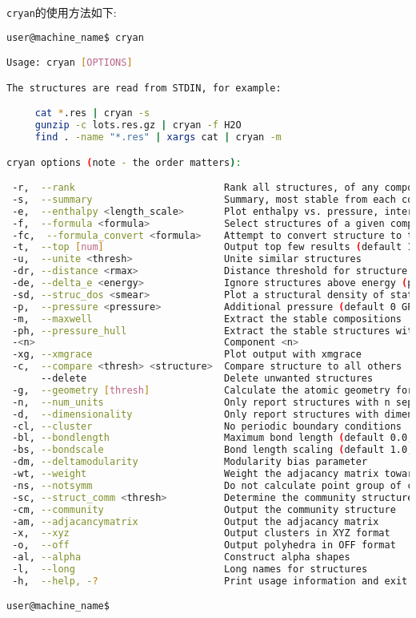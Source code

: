 \documentclass[a4paper, 10pt]{article}
\begin{document}
\verb|cryan|的使用方法如下:
\begin{lstlisting}[language={bash}]
user@machine_name$ cryan

Usage: cryan [OPTIONS]

The structures are read from STDIN, for example:

     cat *.res | cryan -s
     gunzip -c lots.res.gz | cryan -f H2O
     find . -name "*.res" | xargs cat | cryan -m

cryan options (note - the order matters):

 -r,  --rank                          Rank all structures, of any composition
 -s,  --summary                       Summary, most stable from each composition
 -e,  --enthalpy <length_scale>       Plot enthalpy vs. pressure, interpolate with <length_scale>
 -f,  --formula <formula>             Select structures of a given composition
 -fc,  --formula_convert <formula>    Attempt to convert structure to this composition
 -t,  --top [num]                     Output top few results (default 10)
 -u,  --unite <thresh>                Unite similar structures
 -dr, --distance <rmax>               Distance threshold for structure comparison (default 20)
 -de, --delta_e <energy>              Ignore structures above energy (per atom)
 -sd, --struc_dos <smear>             Plot a structural density of states, smeared
 -p,  --pressure <pressure>           Additional pressure (default 0 GPa)
 -m,  --maxwell                       Extract the stable compositions
 -ph, --pressure_hull                 Extract the stable structures with pressure
 -<n>                                 Component <n>
 -xg, --xmgrace                       Plot output with xmgrace
 -c,  --compare <thresh> <structure>  Compare structure to all others
      --delete                        Delete unwanted structures
 -g,  --geometry [thresh]             Calculate the atomic geometry for the structures (default 0.1)
 -n,  --num_units                     Only report structures with n separate units (default -1)
 -d,  --dimensionality                Only report structures with dimensionality of d (default -1.0)
 -cl, --cluster                       No periodic boundary conditions
 -bl, --bondlength                    Maximum bond length (default 0.0, negative for modularity)
 -bs, --bondscale                     Bond length scaling (default 1.0, negative for modularity)
 -dm, --deltamodularity               Modularity bias parameter
 -wt, --weight                        Weight the adjacancy matrix toward short contacts
 -ns, --notsymm                       Do not calculate point group of clusters
 -sc, --struct_comm <thresh>          Determine the community structure
 -cm, --community                     Output the community structure
 -am, --adjacancymatrix               Output the adjacancy matrix
 -x,  --xyz                           Output clusters in XYZ format
 -o,  --off                           Output polyhedra in OFF format
 -al, --alpha                         Construct alpha shapes
 -l,  --long                          Long names for structures
 -h,  --help, -?                      Print usage information and exit

user@machine_name$
\end{lstlisting}
\end{document}
